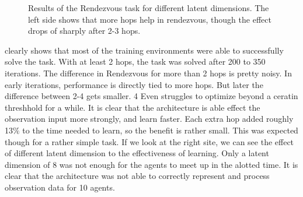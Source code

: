 \begin{figure}[htp]
    \centering
    \hspace{1cm}                       
    \caption{Results of the Rendezvous task for different latent dimensions. The left side shows that more hops help in rendezvous, though the effect drops of sharply after 2-3 hops. }
    \label{fig:proof_of_concept_rendezvous}
\end{figure}

 clearly shows that most of the training environments were able to successfully solve the task. With at least 2 hops, the task was solved after 200 to 350 iterations. The difference in Rendezvous for more than 2 hops is pretty noisy. In early iterations, performance is directly tied to more hops. But later the difference between 2-4 gets smaller. 4 Even struggles to optimize beyond a ceratin threshhold for a while. It is clear that the architecture is able effect the observation input more strongly, and learn faster. Each extra hop added roughly 13$\%$ to the time needed to learn, so the benefit is rather small. This was expected though for a rather simple task. If we look at the right site, we can see the effect of different latent dimension to the effectiveness of learning. Only a latent dimension of 8 was not enough for the agents to meet up in the alotted time. It is clear that the architecture was not able to correctly represent and process observation data for 10 agents.\par

